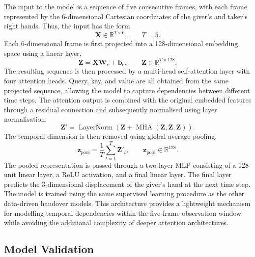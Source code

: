 \documentclass[journal]{IEEEtran}
\begin{document}
The input to the model is a sequence of five consecutive frames, with each frame represented by the 6-dimensional Cartesian coordinates of the giver's and taker's right hands. Thus, the input has the form
\begin{equation}
\mathbf{X} \in \mathbb{R}^{T \times 6},
\qquad T=5.
\end{equation}
Each 6-dimensional frame is first projected into a 128-dimensional embedding space using a linear layer,
\begin{equation}
\mathbf{Z} = \mathbf{X}\mathbf{W}_{e}+\mathbf{b}_{e},
\qquad
\mathbf{Z}\in\mathbb{R}^{T\times128}.
\end{equation}
The resulting sequence is then processed by a multi-head self-attention layer with four attention heads. Query, key, and value are all obtained from the same projected sequence, allowing the model to capture dependencies between different time steps. The attention output is combined with the original embedded features through a residual connection and subsequently normalised using layer normalisation:
\begin{equation}
\mathbf{Z}' =
\operatorname{LayerNorm}
\left(
\mathbf{Z}+
\operatorname{MHA}(\mathbf{Z},\mathbf{Z},\mathbf{Z})
\right).
\end{equation}
The temporal dimension is then removed using global average pooling,
\begin{equation}
\mathbf{z}_{\mathrm{pool}}
=
\frac{1}{T}\sum_{t=1}^{T}\mathbf{Z}'_t,
\qquad
\mathbf{z}_{\mathrm{pool}}\in\mathbb{R}^{128}.
\end{equation}
The pooled representation is passed through a two-layer MLP consisting of a 128-unit linear layer, a ReLU activation, and a final linear layer. The final layer predicts the 3-dimensional displacement of the giver's hand at the next time step. The model is trained using the same supervised learning procedure as the other data-driven handover models. This architecture provides a lightweight mechanism for modelling temporal dependencies within the five-frame observation window while avoiding the additional complexity of deeper attention architectures.

\subsection{Model Validation}
\end{document}
